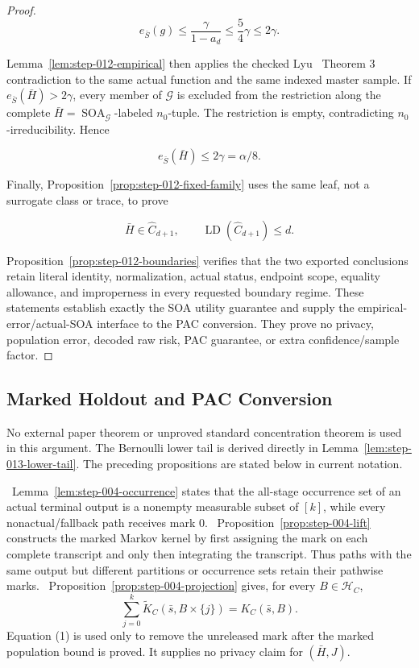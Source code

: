 \begin{proof}
\[
 e_{\bar S}(g)
 \le\frac{\gamma}{1-a_d}
 \le\frac54\gamma
 \le2\gamma.
\]

Lemma~\ref{lem:step-012-empirical} then applies the checked Lyu~\citep{lyu2025} Theorem 3
contradiction to the same actual function and the same indexed master
sample. If \(e_{\bar S}(\bar H)>2\gamma\), every member of
\(\mathcal G\) is excluded from the restriction along the complete
\(\bar H=\operatorname{SOA}_{\mathcal G}\)-labeled \(n_0\)-tuple. The
restriction is empty, contradicting \(n_0\)-irreducibility. Hence

\[
 e_{\bar S}(\bar H)\le2\gamma=\alpha/8.
\]

Finally, Proposition~\ref{prop:step-012-fixed-family} uses the same leaf,
not a surrogate class or trace, to prove

\[
 \bar H\in\widehat C_{d+1},
 \qquad
 \operatorname{LD}(\widehat C_{d+1})\le d.
\]

Proposition~\ref{prop:step-012-boundaries} verifies that the two exported
conclusions retain literal identity, normalization, actual status, endpoint
scope, equality allowance, and improperness in every requested boundary
regime. These statements establish exactly the SOA utility guarantee and
supply the empirical-error/actual-SOA interface to the PAC conversion. They prove
no privacy, population error, decoded raw risk, PAC guarantee, or extra
confidence/sample factor.



\end{proof}

\subsection{Marked Holdout and PAC Conversion}\label{app:step_013}


No external paper theorem or unproved standard concentration theorem is
used in this argument. The Bernoulli lower tail is derived directly in
Lemma~\ref{lem:step-013-lower-tail}. The preceding propositions are stated
below in current notation.


\noindent \ Lemma~\ref{lem:step-004-occurrence} states that the all-stage
  occurrence set of an actual terminal output is a nonempty measurable
  subset of \([k]\), while every nonactual/fallback path receives mark
  \(0\).
\noindent \ Proposition~\ref{prop:step-004-lift} constructs the marked
  Markov kernel by first assigning the mark on each complete transcript and
  only then integrating the transcript. Thus paths with the same output but
  different partitions or occurrence sets retain their pathwise marks.
\noindent \ Proposition~\ref{prop:step-004-projection} gives, for every
  \(B\in\mathcal H_C\),
  \[
    \sum_{j=0}^k\widetilde K_C(\bar s,B\times\{j\})
    =K_C(\bar s,B).
    \tag{1}
  \]
  Equation (1) is used only to remove the unreleased mark after the marked
  population bound is proved. It supplies no privacy claim for
  \((\bar H,J)\).


